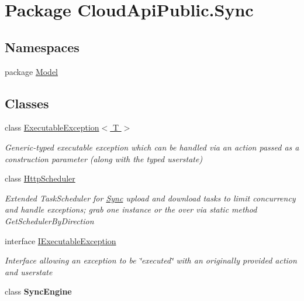 \hypertarget{namespace_cloud_api_public_1_1_sync}{\section{Package Cloud\-Api\-Public.\-Sync}
\label{namespace_cloud_api_public_1_1_sync}
}
\subsection*{Namespaces}
\begin{DoxyCompactItemize}
\item 
package \hyperlink{namespace_cloud_api_public_1_1_sync_1_1_model}{Model}
\end{DoxyCompactItemize}
\subsection*{Classes}
\begin{DoxyCompactItemize}
\item 
class \hyperlink{class_cloud_api_public_1_1_sync_1_1_executable_exception_3_01_t_01_4}{Executable\-Exception$<$ T $>$}
\begin{DoxyCompactList}\small\item\em Generic-\/typed executable exception which can be handled via an action passed as a construction parameter (along with the typed userstate) \end{DoxyCompactList}\item 
class \hyperlink{class_cloud_api_public_1_1_sync_1_1_http_scheduler}{Http\-Scheduler}
\begin{DoxyCompactList}\small\item\em Extended Task\-Scheduler for \hyperlink{namespace_cloud_api_public_1_1_sync}{Sync} upload and download tasks to limit concurrency and handle exceptions; grab one instance or the over via static method Get\-Scheduler\-By\-Direction \end{DoxyCompactList}\item 
interface \hyperlink{interface_cloud_api_public_1_1_sync_1_1_i_executable_exception}{I\-Executable\-Exception}
\begin{DoxyCompactList}\small\item\em Interface allowing an exception to be \char`\"{}executed\char`\"{} with an originally provided action and userstate \end{DoxyCompactList}\item 
class {\bfseries Sync\-Engine}
\end{DoxyCompactItemize}
